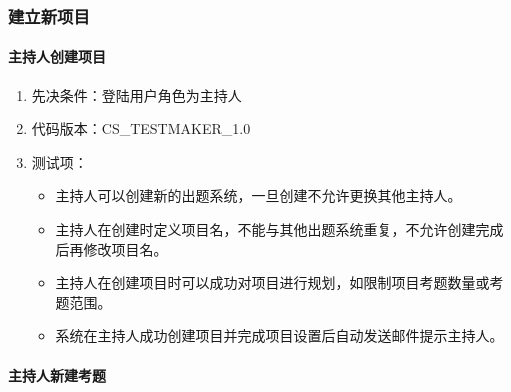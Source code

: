 \documentclass[hyperref, a4paper]{ctexart}
\providecommand{\tightlist}{%
  \setlength{\itemsep}{0pt}\setlength{\parskip}{0pt}}
\let\oldparagraph\paragraph
\renewcommand{\paragraph}[1]{\oldparagraph{#1}\mbox{}}
\begin{document}
\hypertarget{ux5efaux7acbux65b0ux9879ux76ee}{%
\subsubsection{建立新项目}\label{ux5efaux7acbux65b0ux9879ux76ee}}

\hypertarget{ux4e3bux6301ux4ebaux521bux5efaux9879ux76ee}{%
\paragraph{主持人创建项目}\label{ux4e3bux6301ux4ebaux521bux5efaux9879ux76ee}}

\begin{enumerate}
\def\labelenumi{\arabic{enumi}.}
\tightlist
\item
  先决条件：登陆用户角色为主持人
\item
  代码版本：CS\_TESTMAKER\_1.0
\item
  测试项：

  \begin{itemize}
  \tightlist
  \item
    主持人可以创建新的出题系统，一旦创建不允许更换其他主持人。
  \item
    主持人在创建时定义项目名，不能与其他出题系统重复，不允许创建完成后再修改项目名。
  \item
    主持人在创建项目时可以成功对项目进行规划，如限制项目考题数量或考题范围。
  \item
    系统在主持人成功创建项目并完成项目设置后自动发送邮件提示主持人。
  \end{itemize}
\end{enumerate}

\hypertarget{ux4e3bux6301ux4ebaux65b0ux5efaux8003ux9898}{%
\paragraph{主持人新建考题}\label{ux4e3bux6301ux4ebaux65b0ux5efaux8003ux9898}}
\end{document}
